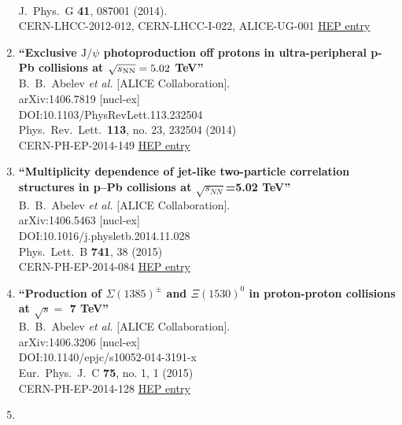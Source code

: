 \begin{enumerate}
  \\{}J.\ Phys.\ G {\bf 41}, 087001 (2014).
  \\{}CERN-LHCC-2012-012, CERN-LHCC-I-022, ALICE-UG-001
\href{http://inspirehep.net/record/1305020}{HEP entry}
\item%
{\bf ``Exclusive $\mathrm{J/}\psi$ photoproduction off protons in ultra-peripheral p-Pb collisions at $\sqrt{s_{\rm NN}}=5.02$ TeV''}
  \\{}B.~B.~Abelev {\it et al.} [ALICE Collaboration].
  \\{}arXiv:1406.7819 [nucl-ex]
  \\{}DOI:10.1103/PhysRevLett.113.232504
  \\{}Phys.\ Rev.\ Lett.\  {\bf 113}, no. 23, 232504 (2014)
  \\{}CERN-PH-EP-2014-149
\href{http://inspirehep.net/record/1303903}{HEP entry}
\item%
{\bf ``Multiplicity dependence of jet-like two-particle correlation structures in p–Pb collisions at $\sqrt{s_{NN}}$=5.02 TeV''}
  \\{}B.~B.~Abelev {\it et al.} [ALICE Collaboration].
  \\{}arXiv:1406.5463 [nucl-ex]
  \\{}DOI:10.1016/j.physletb.2014.11.028
  \\{}Phys.\ Lett.\ B {\bf 741}, 38 (2015)
  \\{}CERN-PH-EP-2014-084
\href{http://inspirehep.net/record/1301858}{HEP entry}
\item%
{\bf ``Production of $\Sigma(1385)^{\pm}$ and $\Xi(1530)^{0}$ in proton-proton collisions at $\sqrt{s}=$ 7 TeV''}
  \\{}B.~B.~Abelev {\it et al.} [ALICE Collaboration].
  \\{}arXiv:1406.3206 [nucl-ex]
  \\{}DOI:10.1140/epjc/s10052-014-3191-x
  \\{}Eur.\ Phys.\ J.\ C {\bf 75}, no. 1, 1 (2015)
  \\{}CERN-PH-EP-2014-128
\href{http://inspirehep.net/record/1300380}{HEP entry}
\item%

\end{enumerate}
